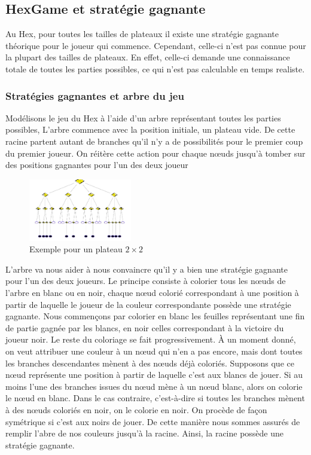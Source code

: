 \subsection{HexGame et stratégie gagnante}

Au Hex, pour toutes les tailles de plateaux il existe une stratégie gagnante théorique pour le joueur qui commence.
Cependant, celle-ci n'est pas connue pour la plupart des tailles de plateaux. En effet, celle-ci demande une connaissance totale de toutes 
les parties possibles, ce qui n'est pas calculable en temps realiste.

\subsubsection{Stratégies gagnantes et arbre du jeu}
Modélisons le jeu du Hex à l'aide d'un arbre représentant toutes les parties possibles, L'arbre commence avec la position 
initiale, un plateau vide. De cette racine partent autant de branches qu'il n'y a de possibilités pour 
le premier coup du premier joueur. On réitère cette action pour chaque nœuds jusqu'à tomber sur des positions gagnantes pour l'un des deux joueur
\begin{figure}[!htb]
    \begin{center}
        \includegraphics[width=0.4\textwidth]{root/strategie_gagnante.png}
    \end{center}
    \caption{Exemple pour un plateau $2\times2$}\label{fig:strategie_gagnante}
\end{figure}

L'arbre va nous aider à nous convaincre qu'il y a bien une stratégie gagnante pour l'un des deux joueurs. 
Le principe consiste à colorier tous les nœuds de l'arbre en blanc ou en noir, chaque
nœud colorié correspondant à une position à partir de laquelle le joueur de la couleur correspondante
possède une stratégie gagnante. 
Nous commençons par colorier en blanc les feuilles représentant une fin de
partie gagnée par les blancs, en noir celles correspondant à la victoire du joueur noir.
Le reste du coloriage se fait progressivement. À un moment donné, on veut attribuer une couleur
à un nœud qui n'en a pas encore, mais dont toutes les branches descendantes mènent à des nœuds
déjà coloriés. Supposons que ce nœud représente une position à partir de laquelle c'est aux blancs de
jouer. Si au moins l'une des branches issues du nœud mène à un nœud blanc, alors on colorie le nœud
en blanc. Dans le cas contraire, c'est-à-dire si toutes les branches mènent à des nœuds coloriés en
noir, on le colorie en noir. On procède de façon symétrique si c'est aux noirs de jouer.
De cette manière nous sommes assurés de remplir l'abre de nos couleurs jusqu'à la racine. 
Ainsi, la racine possède une stratégie gagnante.


